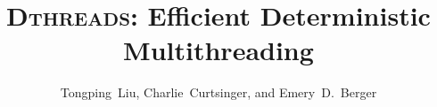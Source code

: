 \documentclass{acm_proc_onecol}
\date{} %
\newcommand{\punt}[1]{}
\newcommand{\dthreads}{{\scshape Dthreads}}
\begin{document}

\title{{\huge \bf \dthreads{}}: Efficient Deterministic Multithreading}


\punt{
\authorinfo{Tongping~Liu \and Charlie~Curtsinger \and Emery~D.~Berger}
{Dept.\ of Computer Science \\
University of Massachusetts, Amherst \\
Amherst, MA 01003}
}

\author{
\alignauthor Tongping~Liu, Charlie~Curtsinger, and Emery~D.~Berger \\
 \\
 \\
 \\
 \\
}

\maketitle

\begin{comment}
\end{comment}
\end{document}
